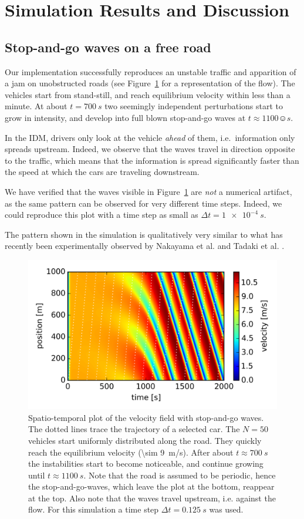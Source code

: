 \section{Simulation Results and Discussion}
\subsection{Stop-and-go waves on a free road}
Our implementation successfully reproduces an unstable traffic and apparition of a jam on unobstructed roads (see Figure~\ref{fig:free_road} for a representation of the flow). The vehicles start from stand-still, and reach equilibrium velocity within less than a minute. At about $t=\SI{700}{s}$ two seemingly independent perturbations start to grow in intensity, and develop into full blown stop-and-go waves at $t\approx \SI{1100}☺{s}$.

In the IDM, drivers only look at the vehicle \emph{ahead} of them, i.e.\ information only spreads upstream. Indeed, we observe that the waves travel in direction opposite to the traffic, which means that the information is spread significantly faster than the speed at which the cars are traveling downstream.

We have verified that the waves visible in Figure~\ref{fig:free_road} are \emph{not} a numerical artifact, as the same pattern can be observed for very different time steps. Indeed, we could reproduce this plot with a time step as small as $\Delta t =\SI{1e-4}{s}$.

The pattern shown in the simulation is qualitatively very similar to what has recently been experimentally observed by Nakayama et al. \cite{nakayama2009} and Tadaki et al. \cite{tadaki2013}.
\begin{figure}
    \centering
    \includegraphics[width=5in]{../img/free_road.png}
    \caption{Spatio-temporal plot of the velocity field with stop-and-go waves. The dotted lines trace the trajectory of a selected car. The $N=50$ vehicles start uniformly distributed along the road. They quickly reach the equilibrium velocity (\SI{\sim 9}{m/s}). After about $t\approx\SI{700}{s}$ the instabilities start to become noticeable, and continue growing until $t\approx \SI{1100}{s}$. Note that the road is assumed to be periodic, hence the stop-and-go-waves, which leave the plot at the bottom, reappear at the top. Also note that the waves travel upstream, i.e. against the flow. For this simulation a time step $\Delta t=\SI{0.125}{s}$ was used.}
    \label{fig:free_road}
\end{figure}
\newpage
